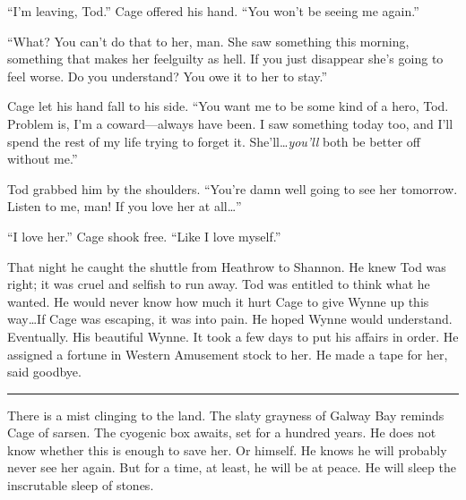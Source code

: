 ``I'm leaving, Tod.'' Cage offered his hand. ``You won't be seeing me again.''

``What? You can't do that to her, man. She saw something this morning, something that makes her feelguilty as hell. If you just disappear she's going to feel worse. Do you understand? You owe it to her to stay.''

Cage let his hand fall to his side. ``You want me to be some kind of a hero, Tod. Problem is, I'm a coward---always have been. I saw something today too, and I'll spend the rest of my life trying to forget it. She'll\ldots \textit{you'll} both be better off without me.''

Tod grabbed him by the shoulders. ``You're damn well going to see her tomorrow. Listen to me, man! If you love her at all\ldots''

``I love her.'' Cage shook free. ``Like I love myself.''

That night he caught the shuttle from Heathrow to Shannon. He knew Tod was right; it was cruel and selfish to run away. Tod was entitled to think what he wanted. He would never know how much it hurt Cage to give Wynne up this way\ldots If Cage was escaping, it was into pain. He hoped Wynne would understand. Eventually. His beautiful Wynne. It took a few days to put his affairs in order. He assigned a fortune in Western Amusement stock to her. He made a tape for her, said goodbye.

\fancybreak{* * *}

There is a mist clinging to the land. The slaty grayness of Galway Bay reminds Cage of sarsen. The cyogenic box awaits, set for a hundred years. He does not know whether this is enough to save her. Or himself. He knows he will probably never see her again. But for a time, at least, he will be at peace. He will sleep the inscrutable sleep of stones.
